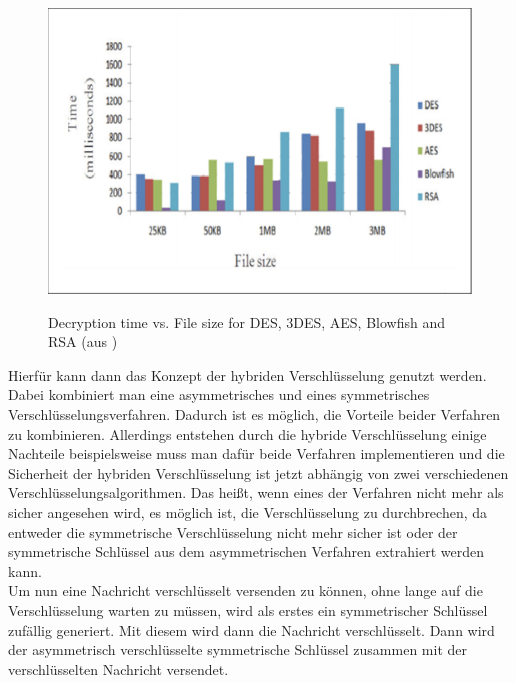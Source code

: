 \documentclass[12pt,a4paper]{scrartcl}
\begin{document}
\begin{figure}[h]		
\includegraphics[scale=0.6]{rsa_time} \\
\caption{Decryption time vs. File size for DES, 3DES, AES, Blowfish and RSA (aus \cite{rsatime})}
\label{fig:figure5}
\end{figure}


		Hierfür kann dann das Konzept der hybriden Verschlüsselung genutzt werden. Dabei kombiniert man eine asymmetrisches und eines symmetrisches Verschlüsselungsverfahren. Dadurch ist es möglich, die Vorteile beider Verfahren zu kombinieren. Allerdings entstehen durch die hybride Verschlüsselung einige Nachteile beispielsweise muss man dafür beide Verfahren implementieren und die Sicherheit der hybriden Verschlüsselung ist jetzt abhängig von zwei verschiedenen Verschlüsselungsalgorithmen. Das heißt, wenn eines der Verfahren nicht mehr als sicher angesehen wird, es möglich ist, die Verschlüsselung zu durchbrechen, da entweder die symmetrische Verschlüsselung nicht mehr sicher ist oder der symmetrische Schlüssel aus dem asymmetrischen Verfahren extrahiert werden kann. \cite[S.18f]{schwenk2010sicherheit}\\
		Um nun eine Nachricht verschlüsselt versenden zu können, ohne lange auf die Verschlüsselung warten zu müssen, wird als erstes ein symmetrischer Schlüssel zufällig generiert. Mit diesem wird dann die Nachricht verschlüsselt. Dann wird der asymmetrisch verschlüsselte symmetrische Schlüssel zusammen mit der verschlüsselten Nachricht versendet. \cite[S.18f]{schwenk2010sicherheit}

\pagebreak
\end{document}
